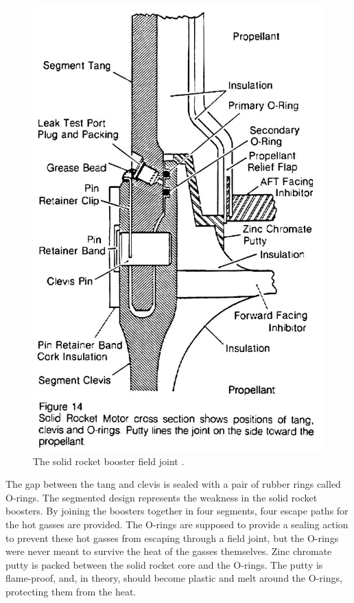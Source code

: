 \begin{figure}[p]
\includegraphics{RogersCommission-v1p57.jpg}
\caption{The solid rocket booster field joint
\protect\cite[vol. 1, p. 57]{rogers}.}
\label{fieldj}
\end{figure}

The gap between the tang and clevis is sealed with a pair of rubber rings called O-rings. The segmented design represents the weakness in the solid rocket boosters. By joining the boosters together in four segments, four escape paths for the hot gasses are provided. The O-rings are supposed to provide a sealing action to prevent these hot gasses from escaping through a field joint, but the O-rings were never meant to survive the heat of the gasses themselves. Zinc chromate putty is packed between the solid rocket core and the O-rings. The putty is flame-proof, and, in theory, should become plastic and melt around the O-rings, protecting them from the heat.


